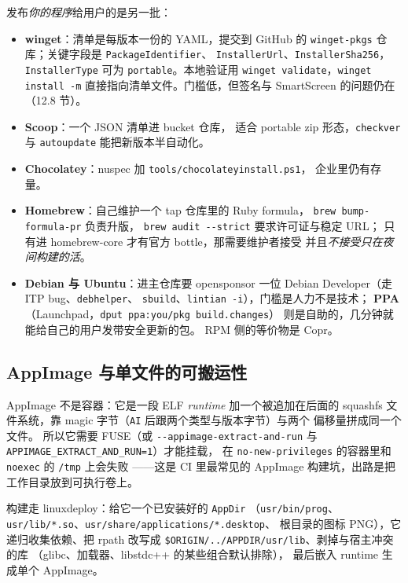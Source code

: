 \documentclass[12pt,a4paper,fontset=fandol]{ctexbook}
\newcommand{\Tp}[1]{\texttt{#1}}
\newcommand{\Bk}{\allowbreak}
\begin{document}
发布\emph{你的程序}给用户的是另一批：
\begin{itemize}
\item \textbf{winget}：清单是每版本一份的 YAML，提交到 GitHub 的
      \Tp{winget\Bk-pkgs} 仓库；关键字段是 \Tp{PackageIdentifier}、
      \Tp{InstallerUrl}、\Tp{InstallerSha256}，
      \Tp{InstallerType} 可为 \Tp{portable}。本地验证用
      \lstinline|winget validate|，\lstinline|winget install -m|
      直接指向清单文件。门槛低，但签名与 SmartScreen 的问题仍在
      （12.8 节）。
\item \textbf{Scoop}：一个 JSON 清单进 bucket 仓库，
      适合 portable zip 形态，\lstinline|checkver| 与
      \lstinline|autoupdate| 能把新版本半自动化。
\item \textbf{Chocolatey}：nuspec 加 \Tp{tools/chocolateyinstall.ps1}，
      企业里仍有存量。
\item \textbf{Homebrew}：自己维护一个 tap 仓库里的 Ruby formula，
      \lstinline|brew bump-formula-pr| 负责升版，
      \lstinline|brew audit --strict| 要求许可证与稳定 URL；
      只有进 homebrew-core 才有官方 bottle，那需要维护者接受
      并且\emph{不接受只在夜间构建的活}。
\item \textbf{Debian 与 Ubuntu}：进主仓库要 opensponsor 一位
      Debian Developer（走 ITP bug、\Tp{debhelper}、
      \lstinline|sbuild|、\lstinline|lintian -i|），门槛是人力不是技术；
      \textbf{PPA}（Launchpad，\lstinline|dput ppa:you/pkg build.changes|）
      则是自助的，几分钟就能给自己的用户发带安全更新的包。
      RPM 侧的等价物是 Copr。
\end{itemize}

\subsection{AppImage 与单文件的可搬运性}

AppImage 不是容器：它是一段 ELF \emph{runtime} 加一个被追加在后面的
squashfs 文件系统，靠 magic 字节（\Tp{AI} 后跟两个类型与版本字节）与两个
偏移量拼成同一个文件。
所以它需要 FUSE（或 \lstinline|--appimage-extract-and-run|
与 \Tp{APPIMAGE\_EXTRACT\_AND\_RUN=1}）才能挂载，
在 \Tp{no-new-privileges} 的容器里和 \Tp{noexec} 的 \Tp{/tmp} 上会失败
——这是 CI 里最常见的 AppImage 构建坑，出路是把工作目录放到可执行卷上。

构建走 linuxdeploy：给它一个已安装好的 \Tp{AppDir}
（\Tp{usr/bin/prog}、\Tp{usr/lib/*.so}、\Tp{usr/share/applications/*.desktop}、
根目录的图标 PNG），它递归收集依赖、把 rpath 改写成
\lstinline|$ORIGIN/../APPDIR/usr/lib|、剥掉与宿主冲突的库
（glibc、加载器、libstdc++ 的某些组合默认排除），
最后嵌入 runtime 生成单个 AppImage。
\end{document}
